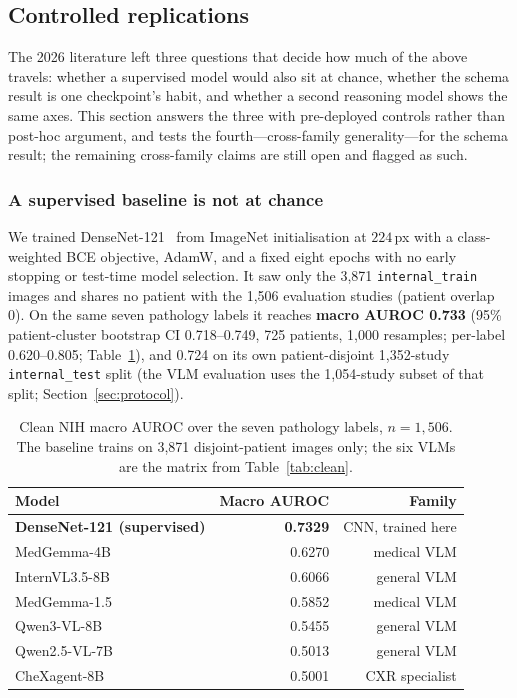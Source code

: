 \subsection{Controlled replications}
\label{sec:results-round2}

The 2026 literature left three questions that decide how much of the above travels: whether a supervised model would also sit at chance, whether the schema result is one checkpoint's habit, and whether a second reasoning model shows the same axes. This section answers the three with pre-deployed controls rather than post-hoc argument, and tests the fourth---cross-family generality---for the schema result; the remaining cross-family claims are still open and flagged as such.

\subsubsection{A supervised baseline is not at chance}
\label{sec:results-baseline}

We trained DenseNet-121~\citep{huang2017densely} from ImageNet initialisation at $224$\,px with a class-weighted BCE objective, AdamW, and a fixed eight epochs with no early stopping or test-time model selection. It saw only the 3,871 \texttt{internal\_train} images and shares no patient with the 1,506 evaluation studies (patient overlap 0). On the same seven pathology labels it reaches \textbf{macro AUROC 0.733} (95\% patient-cluster bootstrap CI 0.718--0.749, 725 patients, 1,000 resamples; per-label 0.620--0.805; Table~\ref{tab:baseline}), and 0.724 on its own patient-disjoint 1,352-study \texttt{internal\_test} split (the VLM evaluation uses the 1,054-study subset of that split; Section~\ref{sec:protocol}).

\begin{table}[t]
\centering
\small
\caption{Clean NIH macro AUROC over the seven pathology labels, $n=1{,}506$. The baseline trains on 3,871 disjoint-patient images only; the six VLMs are the matrix from Table~\ref{tab:clean}.}
\label{tab:baseline}
\begin{tabular}{lrr}
\toprule
Model & Macro AUROC & Family \\
\midrule
\textbf{DenseNet-121 (supervised)} & \textbf{0.7329} & CNN, trained here \\
MedGemma-4B & 0.6270 & medical VLM \\
InternVL3.5-8B & 0.6066 & general VLM \\
MedGemma-1.5 & 0.5852 & medical VLM \\
Qwen3-VL-8B & 0.5455 & general VLM \\
Qwen2.5-VL-7B & 0.5013 & general VLM \\
CheXagent-8B & 0.5001 & CXR specialist \\
\bottomrule
\end{tabular}
\end{table}

